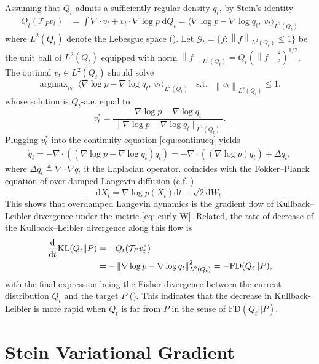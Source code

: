 \documentclass[12pt,paper=letter]{scrreprt}
\newcommand{\dno}{\mathrm{d}}
\def\defeq{\triangleq} %
\def\norm#1{\left\|{#1}\right\|} %
\def\KL#1#2{\textnormal{KL}({#1}\Vert{#2})}
\providecommand{\argmax}{\mathop\mathrm{arg max}} %
\newcommand{\dd}{\mathrm{d}}
\begin{document}
Assuming that $Q_t$ admits a sufficiently regular density $q_t$, by Stein's identity
\begin{align*}
Q_t (\mathcal T_Pv_t) 
& = \int \nabla \cdot v_t + v_t \cdot \nabla \log p \; \dno  Q_t  
 =  \langle \nabla \log p - \nabla \log q_t, ~v_t  \rangle_{L^2(Q_t)}
\end{align*} 
where $L^2(Q_t)$ denote the Lebesgue space ().
Let $\mathcal{G}_t = \{f \colon \norm{f}_{L^2(Q_t)}\leq 1\}$ be the unit ball of $L^2(Q_t)$ equipped with norm $\norm{f}_{L^2(Q_t)} = Q_t(\norm{f}^2_2)^{1/2}$. 
The optimal  $ v_t \in L^2(Q_t)$ should solve
$$
\argmax_{ v_t } \; \langle \nabla \log p - \nabla \log q_t, ~v_t  \rangle_{L^2(Q_t)} ~~~~\text{s.t.}~~~ \norm{ v_t }_{L^2(Q_t)} \leq 1, 
$$
whose solution is $Q_t$-a.e. equal to
$$
 v_t ^* = \frac{ \nabla \log p- \nabla  \log q_t }{ \| \nabla \log p- \nabla  \log q_t \|_{L^2(Q_t)} } .
$$
Plugging $v_t^*$ into the continuity equation \eqref{equ:continueq} yields 
\begin{align}
\dot q_t = - \nabla \cdot ((\nabla \log p -  \nabla \log q_t) q_t) 
= - \nabla \cdot ((\nabla \log p) q_t) 
+ \Delta q_t,  \label{eq: Fokker Planck}
\end{align}
where $\Delta q_t \defeq \nabla \cdot \nabla q_t$ it the Laplacian operator. 
 coincides with the Fokker--Planck equation of over-damped Langevin diffusion (c.f. )
$$
\dno  X_t = \nabla \log p(X_t) \dno t + \sqrt{2}\dno W_t.
$$
This shows that overdamped Langevin dynamics is the gradient flow of Kullback--Leibler divergence under the metric \eqref{eq: curly W}. 
Related, the rate of decrease of the Kullback--Leibler divergence along this flow is 
\begin{align*}
\frac{\dd}{\dd t} \KL{Q_t}{P}  & = - Q_t (\mathcal T_Pv_t^*) \\ 
& = - \norm{\nabla \log p -  \nabla \log q_t}_{L^2(Q_t)}^2
= - \mathrm{FD}(Q_t || P) ,
\end{align*} 
with the final expression being the Fisher divergence between the current distribution $Q_t$ and the target $P$ ().
This indicates that the decrease in Kullback-Leibler is more rapid when $Q_t$ is far from $P$ in the sense of $\mathrm{FD}(Q_t || P)$.


\section{Stein Variational Gradient}   
\label{sec: stein variational gradient}
\end{document}
